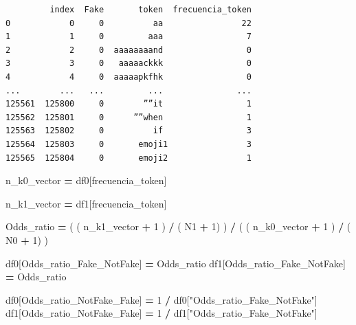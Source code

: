 \documentclass[
  11pt,
  a4paper,
]{article}
\newenvironment{Shaded}{\begin{snugshade}}{\end{snugshade}}
\newcommand{\DecValTok}[1]{\textcolor[rgb]{0.00,0.00,0.81}{#1}}
\newcommand{\NormalTok}[1]{#1}
\newcommand{\OperatorTok}[1]{\textcolor[rgb]{0.81,0.36,0.00}{\textbf{#1}}}
\newcommand{\StringTok}[1]{\textcolor[rgb]{0.31,0.60,0.02}{#1}}
\begin{document}
\begin{verbatim}
         index  Fake       token  frecuencia_token
0            0     0          aa                22
1            1     0         aaa                 7
2            2     0  aaaaaaaand                 0
3            3     0   aaaaackkk                 0
4            4     0  aaaaapkfhk                 0
...        ...   ...         ...               ...
125561  125800     0        ””it                 1
125562  125801     0      ””when                 1
125563  125802     0          if                 3
125564  125803     0       emoji1                3
125565  125804     0       emoji2                1
\end{verbatim}

\begin{Shaded}
\begin{Highlighting}[]

\NormalTok{n\_k0\_vector }\OperatorTok{=}\NormalTok{ df0[}\StringTok{\textquotesingle{}frecuencia\_token\textquotesingle{}}\NormalTok{]}

\NormalTok{n\_k1\_vector }\OperatorTok{=}\NormalTok{ df1[}\StringTok{\textquotesingle{}frecuencia\_token\textquotesingle{}}\NormalTok{]}


\NormalTok{Odds\_ratio }\OperatorTok{=}\NormalTok{ ( ( n\_k1\_vector }\OperatorTok{+} \DecValTok{1}\NormalTok{ ) }\OperatorTok{/}\NormalTok{ ( N1 }\OperatorTok{+} \DecValTok{1}\NormalTok{) ) }\OperatorTok{/}\NormalTok{ ( ( n\_k0\_vector }\OperatorTok{+} \DecValTok{1}\NormalTok{ ) }\OperatorTok{/}\NormalTok{ ( N0 }\OperatorTok{+} \DecValTok{1}\NormalTok{) )}
\end{Highlighting}
\end{Shaded}

\begin{Shaded}
\begin{Highlighting}[]
\NormalTok{df0[}\StringTok{\textquotesingle{}Odds\_ratio\_Fake\_NotFake\textquotesingle{}}\NormalTok{] }\OperatorTok{=}\NormalTok{ Odds\_ratio  }
\NormalTok{df1[}\StringTok{\textquotesingle{}Odds\_ratio\_Fake\_NotFake\textquotesingle{}}\NormalTok{] }\OperatorTok{=}\NormalTok{ Odds\_ratio  }

\NormalTok{df0[}\StringTok{\textquotesingle{}Odds\_ratio\_NotFake\_Fake\textquotesingle{}}\NormalTok{] }\OperatorTok{=} \DecValTok{1} \OperatorTok{/}\NormalTok{ df0[}\StringTok{"Odds\_ratio\_Fake\_NotFake"}\NormalTok{] }
\NormalTok{df1[}\StringTok{\textquotesingle{}Odds\_ratio\_NotFake\_Fake\textquotesingle{}}\NormalTok{] }\OperatorTok{=} \DecValTok{1} \OperatorTok{/}\NormalTok{ df1[}\StringTok{"Odds\_ratio\_Fake\_NotFake"}\NormalTok{]  }
\end{Highlighting}
\end{Shaded}
\end{document}
